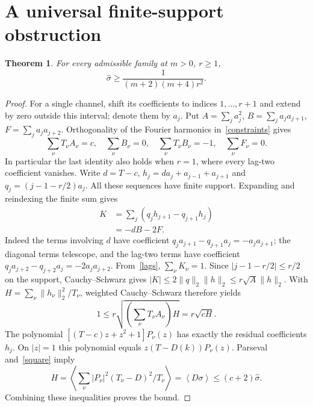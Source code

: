 \documentclass[11pt]{article}
\newtheorem{theorem}{Theorem}
\newcommand{\avg}[1]{\left\langle #1\right\rangle}
\begin{document}
\section{A universal finite-support obstruction}
\begin{theorem}\label{lower}
For every admissible family at $m>0$, $r\ge1$,
\begin{equation}
\hat\sigma\ge \frac{1}{(m+2)(m+4)r^2}.
\end{equation}
\end{theorem}
\begin{proof}
For a single channel, shift its coefficients to indices $1,\ldots,r+1$ and extend by zero outside this interval; denote them by $a_j$. Put $A=\sum_j a_j^2$, $B=\sum_j a_ja_{j+1}$, $F=\sum_j a_ja_{j+2}$. Orthogonality of the Fourier harmonics in~\eqref{constraints} gives
\begin{equation}\label{lags}
\sum_\nu T_\nu A_\nu=c,\quad \sum_\nu B_\nu=0,\quad
\sum_\nu T_\nu B_\nu=-1,\quad \sum_\nu F_\nu=0.
\end{equation}
In particular the last identity also holds when $r=1$, where every lag-two coefficient vanishes. Write $d=T-c$, $h_j=d a_j+a_{j-1}+a_{j+1}$ and $q_j=(j-1-r/2)a_j$. All these sequences have finite support. Expanding and reindexing the finite sum gives
\begin{align}
K&=\sum_j(q_jh_{j+1}-q_{j+1}h_j)\\
 &= -dB-2F.
\end{align}
Indeed the terms involving $d$ have coefficient $q_ja_{j+1}-q_{j+1}a_j=-a_ja_{j+1}$; the diagonal terms telescope, and the lag-two terms have coefficient $q_ja_{j+2}-q_{j+2}a_j=-2a_ja_{j+2}$. From~\eqref{lags}, $\sum_\nu K_\nu=1$.
Since $|j-1-r/2|\le r/2$ on the support, Cauchy--Schwarz gives $|K|\le 2\|q\|_2\|h\|_2\le r\sqrt{A}\|h\|_2$. With $H=\sum_\nu\|h_\nu\|_2^2/T_\nu$, weighted Cauchy--Schwarz therefore yields
\begin{equation}
1\le r\sqrt{\left(\sum_\nu T_\nu A_\nu\right)H}=r\sqrt{cH}.
\end{equation}
The polynomial $[(T-c)z+z^2+1]P_\nu(z)$ has exactly the residual coefficients $h_j$. On $|z|=1$ this polynomial equals $z(T-D(k))P_\nu(z)$. Parseval and~\eqref{square} imply
\begin{equation}
H=\avg{\sum_\nu |P_\nu|^2(T_\nu-D)^2/T_\nu}
=\avg{D\sigma}\le(c+2)\hat\sigma.
\end{equation}
Combining these inequalities proves the bound.
\end{proof}
\end{document}

